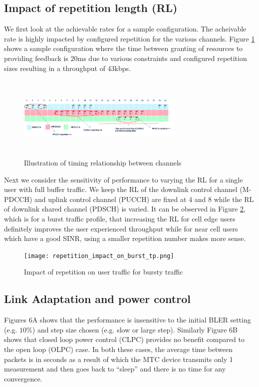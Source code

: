 \documentclass[conference,compsoc]{IEEEtran}
\begin{document}
\subsection{Impact of repetition length (RL)}
We first look at the achievable rates for a sample configuration. The acheivable rate is highly impacted by configured repetition for the various channels. Figure \ref{fig_harq_timing} shows a sample configuration where the time between granting of resources to providing feedback is $20$ms due to various constraints and configured repetition sizes resulting in a throughput of 43kbps. 

\begin{figure}[htbp]
\centerline{\includegraphics[height=40mm,width=80mm]{timing_relation.png}}
\caption{Illustration of timing relationship between channels}
\label{fig_harq_timing}
\end{figure}


Next we consider the sensitivity of performance to varying the RL for a single user with full buffer traffic. We keep the RL of the downlink control channel (M-PDCCH) and uplink control channel (PUCCH) are fixed at $4$ and $8$ while the RL of downlink shared channel (PDSCH) is varied. It can be observed in Figure \ref{fig_rep_burst}, which is for a burst traffic profile, that increasing the RL for cell edge users definitely improves the user experienced throughput while for near cell users which have a good SINR, using a smaller repetition number makes more sense.

\begin{figure}[htbp]
\centerline{\texttt{[image: repetition\_impact\_on\_burst\_tp.png]}}
\caption{Impact of repetition on user traffic for bursty traffic}
\label{fig_rep_burst}
\end{figure}


\subsection{Link Adaptation and power control}
Figures 6A shows that the performance is insensitive to the initial BLER setting (e.g. $10$\%) and step size chosen (e.g. slow or large step). Similarly Figure 6B shows that closed loop power control (CLPC) provides no benefit compared to the open loop (OLPC) case. In both these cases, the average time between packets is in seconds as a result of which the MTC device transmits only 1 measurement and then goes back to “sleep” and there is no time for any convergence.  
\end{document}
